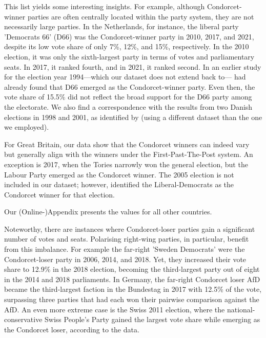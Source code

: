 \documentclass[12pt]{scrartcl}
\begin{document}


This list yields some interesting insights. For example, although Condorcet-winner parties are often centrally located within the party system, they are not necessarily large parties. In the Netherlands, for instance, the liberal party 'Democrats 66' (D66) was the Condorcet-winner party in 2010, 2017, and 2021, despite its low vote share of only 7\%, 12\%, and 15\%, respectively. In the 2010 election, it was only the sixth-largest party in terms of votes and parliamentary seats. In 2017, it ranked fourth, and in 2021, it ranked second. In an earlier study for the election year 1994---which our dataset does not extend back to---\cite{vanDeemen1998} had already found that D66 emerged as the Condorcet-winner party. Even then, the vote share of 15.5\% did not reflect the broad support for the D66 party among the electorate. We also find a correspondence with the results from two Danish elections in 1998 and 2001, as identified by \cite{KurrildKlitgaard2008} (using a different dataset than the one we employed). 

For Great Britain, our data show that the Condorcet winners can indeed vary but generally align with the winners under the First-Past-The-Post system. An exception is 2017, when the Tories narrowly won the general election, but the Labour Party emerged as the Condorcet winner. The 2005 election is not included in our dataset; however, \cite{Abramson2013} identified the Liberal-Democrats as the Condorcet winner for that election.

Our (Online-)Appendix presents the values for all other countries.

Noteworthy, there are instances where Condorcet-loser parties gain a significant number of votes and seats. Polarising right-wing parties, in particular, benefit from this imbalance. For example the far-right 'Sweden Democrats' were the Condorcet-loser party in 2006, 2014, and 2018. Yet, they increased their vote share to 12.9\% in the 2018 election, becoming the third-largest party out of eight in the 2014 and 2018 parliaments. In Germany, the far-right Condorcet loser AfD became the third-largest faction in the Bundestag in 2017 with 12.5\% of the vote, surpassing three parties that had each won their pairwise comparison against the AfD. An even more extreme case is the Swiss 2011 election, where the national-conservative Swiss People's Party gained the largest vote share while emerging as the Condorcet loser, according to the data. 
\end{document}
